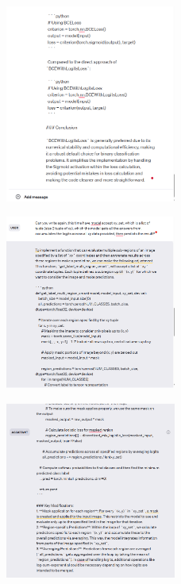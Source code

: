\documentclass{article}
\begin{document}
\begin{figure}[H]
    \centering
    \includegraphics[width=0.5\textwidth]{report_data/g-12.png}
\end{figure}

\begin{figure}[H]
    \centering
    \includegraphics[width=0.5\textwidth]{report_data/g-13.png}

\end{figure}

\begin{figure}[H]
    \centering
    \includegraphics[width=0.5\textwidth]{report_data/g-14.png}
\end{figure}
\end{document}
